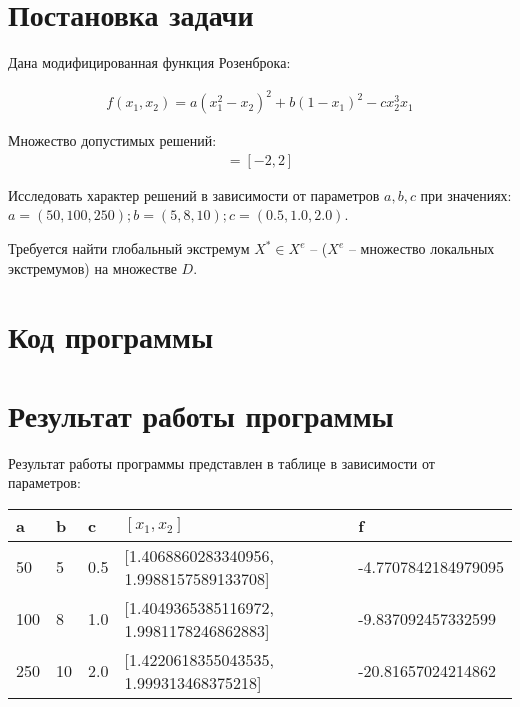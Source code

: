\section{Постановка задачи}
    Дана модифицированная функция Розенброка:

    \begin{gather}
        f(x_1, x_2) = a(x_1^2 - x_2)^2 + b(1 - x_1)^2 - cx_2^3x_1 \nonumber
    \end{gather}

    Множество допустимых решений:
    \begin{gather}
        [x_i^{min}, x_i^{max}] = [-2, 2] \nonumber
    \end{gather}

    Исследовать характер решений в зависимости от параметров $a, b, c$ при значениях:
    $a = (50, 100, 250); b = (5, 8, 10); c = (0.5, 1.0, 2.0)$.

    Требуется найти глобальный экстремум $X^* \in {X^e}$ -- (${X^e}$ -- множество локальных экстремумов) на множестве $D$.
\section{Код программы}
    

\section{Результат работы программы}
    Результат работы программы представлен в таблице в зависимости от параметров:

    \begin{tabular}{|l|l|l|l|l|}\hline
        a & b & c & $[x_1, x_2]$ & f \\ \hline
        50 & 5 & 0.5 & [1.4068860283340956, 1.9988157589133708] & -4.7707842184979095 \\ \hline
        100 & 8 & 1.0 & [1.4049365385116972, 1.9981178246862883] & -9.837092457332599 \\ \hline
        250 & 10 & 2.0 & [1.4220618355043535, 1.999313468375218] & -20.81657024214862 \\ \hline
    \end{tabular}
